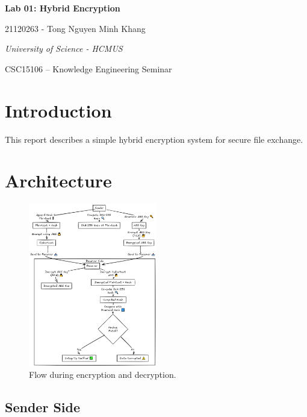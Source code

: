 \documentclass{article}
\begin{document}
\begin{titlepage}
\centering
{\LARGE\bfseries Lab 01: Hybrid Encryption}

\vspace{1cm}

{\large 21120263 - Tong Nguyen Minh Khang}

\vfill

{\itshape University of Science - HCMUS}

\vspace{0.5cm}
{CSC15106 – Knowledge Engineering Seminar}

\end{titlepage}

\section{Introduction}
This report describes a simple hybrid encryption system for secure file exchange.

\section{Architecture}

\begin{figure}[h]
    \centering
    \includegraphics[width=0.5\textwidth]{diagram.png}
    \caption{Flow during encryption and decryption.}
    \label{fig:sample}
\end{figure}

\subsection*{Sender Side}
\end{document}
